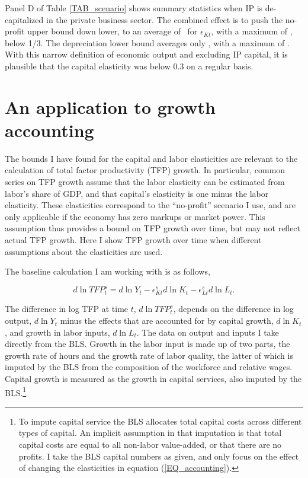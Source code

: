 \documentclass[11pt]{article}
\begin{document}
Panel D of Table \ref{TAB_scenario} shows summary statistics when IP is de-capitalized in the private business sector. The combined effect is to push the no-profit upper bound down lower, to an average of \exclnoprofit \ for $\epsilon_{Kt}$, with a maximum of \exclmaxnoprofit, below 1/3. The depreciation lower bound averages only \excldepr, with a maximum of \exclmaxdepr. With this narrow definition of economic output and excluding IP capital, it is plausible that the capital elasticity was below 0.3 on a regular basis.

\section{An application to growth accounting}
The bounds I have found for the capital and labor elasticities are relevant to the calculation of total factor productivity (TFP) growth. In particular, common series on TFP growth assume that the labor elasticity can be estimated from labor's share of GDP, and that capital's elasticity is one minus the labor elasticity. These elasticities correspond to the ``no-profit'' scenario I use, and are only applicable if the economy has zero markups or market power. This assumption thus provides a bound on TFP growth over time, but may not reflect actual TFP growth. Here I show TFP growth over time when different assumptions about the elasticities are used. 

The baseline calculation I am working with is as follows,

\begin{equation}
	d \ln TFP^s_t = d \ln Y_t - \epsilon^s_{Kt} d \ln K_t - \epsilon^s_{Lt} d \ln L_t. \label{EQ_accounting}
\end{equation}

The difference in log TFP at time $t$, $d \ln TFP^s_t$, depends on the difference in log output, $d \ln Y_t$ minus the effects that are accounted for by capital growth, $d \ln K_t$, and growth in labor inputs, $d \ln L_t$. The data on output and inputs I take directly from the BLS. Growth in the labor input is made up of two parts, the growth rate of hours and the growth rate of labor quality, the latter of which is imputed by the BLS from the composition of the workforce and relative wages. Capital growth is measured as the growth in capital services, also imputed by the BLS.\footnote{To impute capital service the BLS allocates total capital costs across different types of capital. An implicit assumption in that imputation is that total capital costs are equal to all non-labor value-added, or that there are no profits. I take the BLS capital numbers as given, and only focus on the effect of changing the elasticities in equation (\ref{EQ_accounting}).}
\end{document}
